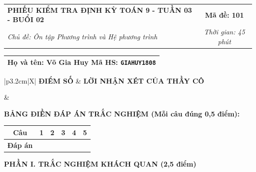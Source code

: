 \documentclass[12pt,a4paper]{article}
\begin{document}
\newpage



\noindent
\begin{tabularx}{\linewidth}{|X|c|}
\hline
\textbf{PHIẾU KIỂM TRA ĐỊNH KỲ TOÁN 9 - TUẦN 03 - BUỔI 02} & \textbf{Mã đề: 101} \\
\textit{Chủ đề: Ôn tập Phương trình và Hệ phương trình} & \textit{Thời gian: 45 phút} \\
\hline
\end{tabularx}

\vspace{1mm}

\noindent
\begin{tabularx}{\linewidth}{|X|}
\hline
\rule[-2mm]{0pt}{7.5mm}\textbf{Họ và tên:} \textbf{\large Võ Gia Huy} \hfill \textbf{Mã HS:} \texttt{GIAHUY1808} \quad \\
\hline
\end{tabularx}

\vspace{1mm}

\noindent
\begin{tabularx}{\linewidth}{|p{3.2cm}|X|}
\hline
\centering\textbf{ĐIỂM SỐ} & \centering\textbf{LỜI NHẬN XÉT CỦA THẦY CÔ} \tabularnewline
\hline
\rule{0pt}{1.3cm} & \tabularnewline
\hline
\end{tabularx}

\vspace{1.2mm}

\noindent\textbf{BẢNG ĐIỀN ĐÁP ÁN TRẮC NGHIỆM (Mỗi câu đúng 0,5 điểm):}
\vspace{0.8mm}

\noindent
\renewcommand{\arraystretch}{1.35}
\begin{tabularx}{\linewidth}{|c|*{5}{>{\centering\arraybackslash}X|}}
\hline
\textbf{Câu} & \textbf{1} & \textbf{2} & \textbf{3} & \textbf{4} & \textbf{5} \\
\hline
\textbf{Đáp án} & & & & & \\
\hline
\end{tabularx}
\renewcommand{\arraystretch}{1.0}

\vspace{1.5mm}

\noindent\textbf{\large PHẦN I. TRẮC NGHIỆM KHÁCH QUAN (2,5 điểm)}
\vspace{1mm}
\end{document}
